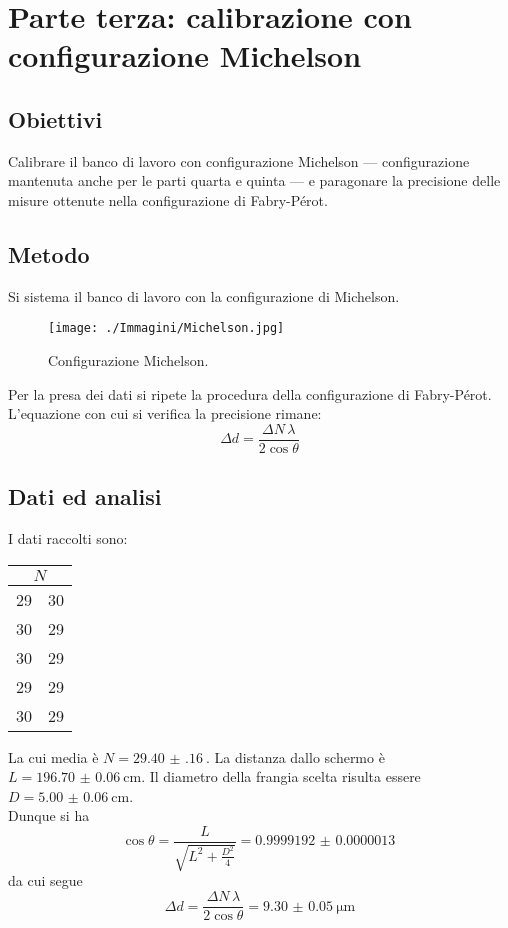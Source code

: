 \documentclass[a4paper]{article}
\begin{document}
\clearpage
\section{Parte terza: calibrazione con configurazione Michelson}

\subsection{Obiettivi}

Calibrare il banco di lavoro con configurazione Michelson --- configurazione mantenuta anche per le parti quarta e quinta --- e paragonare la precisione delle misure ottenute nella configurazione di Fabry-Pérot.

\subsection{Metodo}
Si sistema il banco di lavoro con la configurazione di Michelson.
\begin{figure}[H]
    \centering
    \texttt{[image: ./Immagini/Michelson.jpg]}
    \caption[Configurazione Michelson]{Configurazione Michelson.}\label{fig:2}
\end{figure}
Per la presa dei dati si ripete la procedura della configurazione di Fabry-Pérot. L'equazione con cui si verifica la precisione rimane:
\[
	\Delta d = \frac{\Delta N\,\lambda}{2\cos\theta}
\]

\subsection{Dati ed analisi}
I dati raccolti sono:
\begin{center}
\begin{tabular}[h]{c|c}
	\multicolumn{2}{c}{$N$} \\\midrule
	\SI{29}{} & \SI{30}{} \\
    	\SI{30}{} & \SI{29}{} \\
    	\SI{30}{} & \SI{29}{} \\
    	\SI{29}{} & \SI{29}{} \\
    	\SI{30}{} & \SI{29}{} \\
\end{tabular}
\end{center}
La cui media è $N=\SI{29.40(16)}{}$. La distanza dallo schermo è $L=\SI{196.70(6)}{\cm}$. Il diametro della frangia scelta risulta essere $D=\SI{5.00(6)}{\cm}$.\\
Dunque si ha
\[
\cos \theta= \frac{L}{\sqrt{L^2+\frac{D^2}{4}} }=\SI{0.9999192(13)}{}
\] 
da cui segue
\[
\Delta d = \frac{\Delta N\,\lambda}{2 \cos \theta}=\SI{9.30(5)}{\micro\m}
\] 
\end{document}
